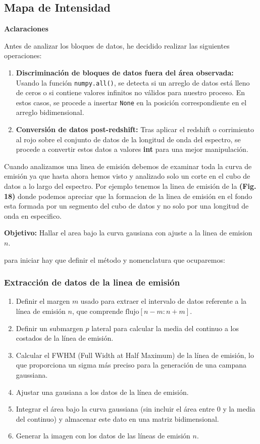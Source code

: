 \documentclass[9pt,twocolumn,a4paper]{opticajnl}
\begin{document}
\subsection*{Mapa de Intensidad}

\textbf{Aclaraciones}

Antes de analizar los bloques de datos, he decidido realizar las siguientes operaciones:

\begin{enumerate}
\item \textbf{Discriminación de bloques de datos fuera del área observada:} Usando la función \texttt{numpy.all()}, se detecta si un arreglo de datos está lleno de ceros o si contiene valores infinitos no válidos para nuestro proceso. En estos casos, se procede a insertar \texttt{None} en la posición correspondiente en el arreglo bidimensional.
\item \textbf{Conversión de datos post-redshift:} Tras aplicar el redshift o corrimiento al rojo sobre el conjunto de datos de la longitud de onda del espectro, se procede a convertir estos datos a valores \textbf{int} para una mejor manipulación.
\end{enumerate}

Cuando analizamos una linea de emisión debemos de examinar toda la curva de emisión ya que hasta ahora hemos visto y analizado solo un corte en el cubo de datos a lo largo del espectro. Por ejemplo tenemos la linea de emisión de la \textbf{(Fig. 18)} donde podemos apreciar que la formacion de la linea de emisión en el fondo esta formada por un segmento del cubo de datos y no solo por una longitud de onda en especifico.

\textbf{Objetivo: } Hallar el area bajo la curva gausiana con ajuste a la linea de emision $n$. 

para iniciar hay que definir el método y nomenclatura que ocuparemos:
\subsubsection*{Extracción de datos de la linea de emisión}

\begin{enumerate}
  \item Definir el margen \( m \) usado para extraer el intervalo de datos referente a la línea de emisión \( n \), que comprende \( \text{flujo}[n-m:n+m] \).
  \item Definir un submargen \( p \) lateral para calcular la media del continuo a los costados de la línea de emisión.
  \item Calcular el FWHM (Full Width at Half Maximum) de la línea de emisión, lo que proporciona un sigma más preciso para la generación de una campana gaussiana.
  \item Ajustar una gausiana a los datos de la línea de emisión.
  \item Integrar el área bajo la curva gaussiana (sin incluir el área entre 0 y la media del continuo) y almacenar este dato en una matriz bidimensional.
  \item Generar la imagen con los datos de las líneas de emisión \( n \).
\end{enumerate}
\end{document}
